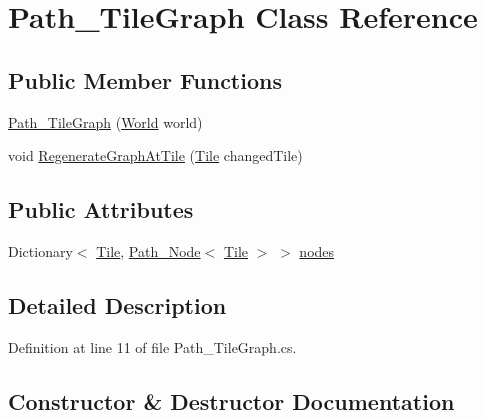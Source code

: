 \hypertarget{class_path___tile_graph}{}\section{Path\+\_\+\+Tile\+Graph Class Reference}
\label{class_path___tile_graph}
\subsection*{Public Member Functions}
\begin{DoxyCompactItemize}
\item 
\hyperlink{class_path___tile_graph_aaf23d4dcbaa6bc52bee72b9cab255e51}{Path\+\_\+\+Tile\+Graph} (\hyperlink{class_world}{World} world)
\item 
void \hyperlink{class_path___tile_graph_a60431b22f15a01b5fd6f43c4be7bf5b0}{Regenerate\+Graph\+At\+Tile} (\hyperlink{class_tile}{Tile} changed\+Tile)
\end{DoxyCompactItemize}
\subsection*{Public Attributes}
\begin{DoxyCompactItemize}
\item 
Dictionary$<$ \hyperlink{class_tile}{Tile}, \hyperlink{class_path___node}{Path\+\_\+\+Node}$<$ \hyperlink{class_tile}{Tile} $>$ $>$ \hyperlink{class_path___tile_graph_a8bb424d60e5c280b6e7a8ad621ed7728}{nodes}
\end{DoxyCompactItemize}


\subsection{Detailed Description}


Definition at line 11 of file Path\+\_\+\+Tile\+Graph.\+cs.



\subsection{Constructor \& Destructor Documentation}
\mbox{\label{class_path___tile_graph_aaf23d4dcbaa6bc52bee72b9cab255e51}} 
